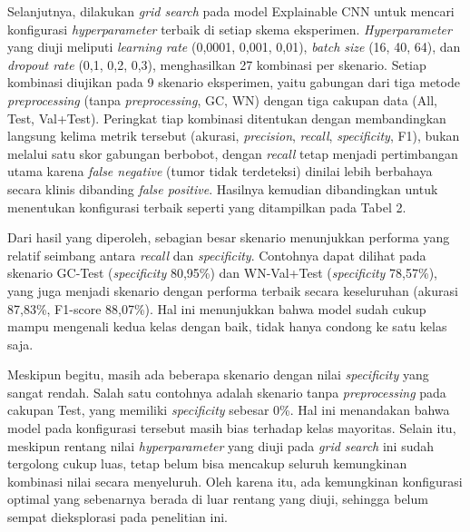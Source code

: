 Selanjutnya, dilakukan \textit{grid search} pada model Explainable CNN untuk mencari konfigurasi \textit{hyperparameter} terbaik di setiap skema eksperimen. \textit{Hyperparameter} yang diuji meliputi \textit{learning rate} (0,0001, 0,001, 0,01), \textit{batch size} (16, 40, 64), dan \textit{dropout rate} (0,1, 0,2, 0,3), menghasilkan 27 kombinasi per skenario. Setiap kombinasi diujikan pada 9 skenario eksperimen, yaitu gabungan dari tiga metode \textit{preprocessing} (tanpa \textit{preprocessing}, GC, WN) dengan tiga cakupan data (All, Test, Val+Test). Peringkat tiap kombinasi ditentukan dengan membandingkan langsung kelima metrik tersebut (akurasi, \textit{precision}, \textit{recall}, \textit{specificity}, F1), bukan melalui satu skor gabungan berbobot, dengan \textit{recall} tetap menjadi pertimbangan utama karena \textit{false negative} (tumor tidak terdeteksi) dinilai lebih berbahaya secara klinis dibanding \textit{false positive}. Hasilnya kemudian dibandingkan untuk menentukan konfigurasi terbaik seperti yang ditampilkan pada Tabel 2.

Dari hasil yang diperoleh, sebagian besar skenario menunjukkan performa yang relatif seimbang antara \textit{recall} dan \textit{specificity}. Contohnya dapat dilihat pada skenario GC-Test (\textit{specificity} 80,95\%) dan WN-Val+Test (\textit{specificity} 78,57\%), yang juga menjadi skenario dengan performa terbaik secara keseluruhan (akurasi 87,83\%, F1-score 88,07\%). Hal ini menunjukkan bahwa model sudah cukup mampu mengenali kedua kelas dengan baik, tidak hanya condong ke satu kelas saja.

Meskipun begitu, masih ada beberapa skenario dengan nilai \textit{specificity} yang sangat rendah. Salah satu contohnya adalah skenario tanpa \textit{preprocessing} pada cakupan Test, yang memiliki \textit{specificity} sebesar 0\%. Hal ini menandakan bahwa model pada konfigurasi tersebut masih bias terhadap kelas mayoritas. Selain itu, meskipun rentang nilai \textit{hyperparameter} yang diuji pada \textit{grid search} ini sudah tergolong cukup luas, tetap belum bisa mencakup seluruh kemungkinan kombinasi nilai secara menyeluruh. Oleh karena itu, ada kemungkinan konfigurasi optimal yang sebenarnya berada di luar rentang yang diuji, sehingga belum sempat dieksplorasi pada penelitian ini.

